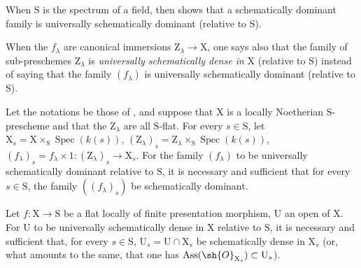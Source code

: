 When $\mathrm{S}$ is the spectrum of a field,  then shows that a schematically dominant family is universally schematically dominant (relative to $\mathrm{S}$).

When the $f_\lambda$ are canonical immersions $\mathrm{Z}_\lambda\to\mathrm{X}$, one says also that the family of sub-preschemes $\mathrm{Z}_\lambda$ is \emph{universally schematically dense in} $\mathrm{X}$ (relative to $\mathrm{S}$) instead of saying that the family $(f_\lambda)$ is universally schematically dominant (relative to $\mathrm{S}$).

\begin{theorem}[11.10.9]
\label{IV.11.10.9}
Let the notations be those of , and suppose that $\mathrm{X}$ is a locally Noetherian $\mathrm{S}$-prescheme and that the $\mathrm{Z}_\lambda$ are all $\mathrm{S}$-flat.
For every $s\in\mathrm{S}$, let $\mathrm{X}_s=\mathrm{X}\times_\mathrm{S}\operatorname{Spec}(k(s))$, $(\mathrm{Z}_\lambda)_s=\mathrm{Z}_\lambda\times_\mathrm{S}\operatorname{Spec}(k(s))$, $(f_\lambda)_s=f_\lambda\times 1:(\mathrm{Z}_\lambda)_s\to\mathrm{X}_s$.
For the family $(f_\lambda)$ to be universally schematically dominant relative to $\mathrm{S}$, it is necessary and sufficient that for every $s\in\mathrm{S}$, the family $((f_\lambda)_s)$ be schematically dominant.
\end{theorem}

\begin{proposition}[11.10.10]
\label{IV.11.10.10}
Let $f:\mathrm{X}\to\mathrm{S}$ be a flat locally of finite presentation morphism, $\mathrm{U}$ an open of $\mathrm{X}$.
For $\mathrm{U}$ to be universally schematically dense in $\mathrm{X}$ relative to $\mathrm{S}$, it is necessary and sufficient that, for every $s\in\mathrm{S}$, $\mathrm{U}_s=\mathrm{U}\cap\mathrm{X}_s$ be schematically dense in $\mathrm{X}_s$ (or, what amounts to the same, that one has $\operatorname{Ass}(\sh{O}_{\mathrm{X}_s})\subset\mathrm{U}_s$).
\end{proposition}
